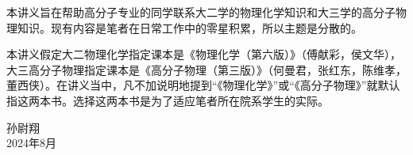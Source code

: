 \documentclass[main.tex]{subfiles}
\begin{document}
本讲义旨在帮助高分子专业的同学联系大二学的物理化学知识和大三学的高分子物理知识。现有内容是笔者在日常工作中的零星积累，所以主题是分散的。

本讲义假定大二物理化学指定课本是《物理化学（第六版）》（傅献彩，侯文华），大三高分子物理指定课本是《高分子物理（第三版）》（何曼君，张红东，陈维孝，董西侠）。在讲义当中，凡不加说明地提到“《物理化学》”或“《高分子物理》”就默认指这两本书。选择这两本书是为了适应笔者所在院系学生的实际。

\begin{flushright}
    孙尉翔\\
    2024年8月
\end{flushright}
\end{document}
